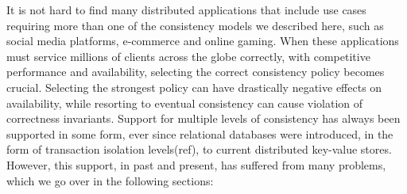 It is not hard to find many distributed applications that include use cases
requiring more than one of the consistency models we described here, such as social media
platforms, e-commerce and online gaming. When these applications must service millions of
clients across the globe correctly, with competitive performance and
availability, selecting the correct consistency policy becomes crucial.
Selecting the strongest policy can have drastically negative effects on availability, while
resorting to eventual consistency can cause violation of correctness invariants.
Support for multiple levels of consistency has always been supported in some
form, ever since relational databases were introduced, in the form of
transaction isolation levels(ref), to current distributed key-value stores.
However, this support, in past and present, has suffered from many problems,
which we go over in the following sections:

